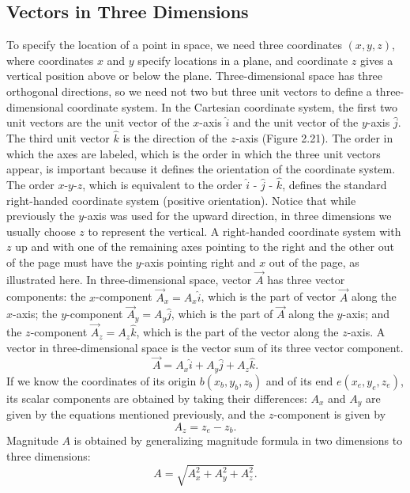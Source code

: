 \documentclass{report}
\begin{document}
        \pagebreak \bigbreak \noindent 
        \subsection{Vectors in Three Dimensions}
        \bigbreak \noindent 
        To specify the location of a point in space, we need three coordinates $(x, y, z)$, where coordinates $x$ and $y$ specify locations in a plane, and coordinate $z$ gives a vertical position above or below the plane. Three-dimensional space has three orthogonal directions, so we need not two but three unit vectors to define a three-dimensional coordinate system. In the Cartesian coordinate system, the first two unit vectors are the unit vector of the $x$-axis $\hat{i}$ and the unit vector of the $y$-axis $\hat{j}$. The third unit vector $\hat{k}$ is the direction of the $z$-axis (Figure 2.21). The order in which the axes are labeled, which is the order in which the three unit vectors appear, is important because it defines the orientation of the coordinate system. The order $x$-$y$-$z$, which is equivalent to the order $\hat{i}$ - $\hat{j}$ - $\hat{k}$, defines the standard right-handed coordinate system (positive orientation). Notice that while previously the $y$-axis was used for the upward direction, in three dimensions we usually choose $z$ to represent the vertical. A right-handed coordinate system with $z$ up and with one of the remaining axes pointing to the right and the other out of the page must have the $y$-axis pointing right and $x$ out of the page, as illustrated here.
        \bigbreak \noindent 
        In three-dimensional space, vector $\vec{A}$ has three vector components: the $x$-component $\vec{A}_x = A_x \hat{i}$, which is the part of vector $\vec{A}$ along the $x$-axis; the $y$-component $\vec{A}_y = A_y \hat{j}$, which is the part of $\vec{A}$ along the $y$-axis; and the $z$-component $\vec{A}_z = A_z \hat{k}$, which is the part of the vector along the $z$-axis. A vector in three-dimensional space is the vector sum of its three vector component. 
        \[
            \vec{A} = A_x \hat{i} + A_y \hat{j} + A_z \hat{k}.
        \]
        If we know the coordinates of its origin $b(x_b, y_b, z_b)$ and of its end $e(x_e, y_e, z_e)$, its scalar components are obtained by taking their differences: $A_x$ and $A_y$ are given by the equations mentioned previously, and the $z$-component is given by
        \[
            A_z = z_e - z_b.
        \]
        Magnitude $A$ is obtained by generalizing magnitude formula in two dimensions to three dimensions:
        \[
            A = \sqrt{A_x^2 + A_y^2 + A_z^2}.
        \]
\end{document}
